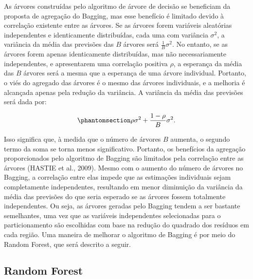 \documentclass[
  12pt,
  a4paper,
]{scrreprt}
\begin{document}
\vspace{12pt}

As árvores construídas pelo algoritmo de árvore de decisão se beneficiam
da proposta de agregação do Bagging, mas esse benefício é limitado
devido à correlação existente entre as árvores. Se as árvores forem
variáveis aleatórias independentes e identicamente distribuídas, cada
uma com variância \(\sigma^2\), a variância da média das previsões das
\(B\) árvores será \(\frac{1}{B} \sigma^2\). No entanto, se as árvores
forem apenas identicamente distribuídas, mas não necessariamente
independentes, e apresentarem uma correlação positiva \(\rho\), a
esperança da média das \(B\) árvores será a mesma que a esperança de uma
árvore individual. Portanto, o viés do agregado das árvores é o mesmo
das árvores individuais, e a melhoria é alcançada apenas pela redução da
variância. A variância da média das previsões será dada por:

\begin{equation}\phantomsection\label{eq-cor}{
\rho \sigma^2 + \frac{1 - \rho}{B}\sigma^2\text{.}
}\end{equation}

Isso significa que, à medida que o número de árvores \(B\) aumenta, o
segundo termo da soma se torna menos significativo. Portanto, os
benefícios da agregação proporcionados pelo algoritmo de Bagging são
limitados pela correlação entre as árvores (HASTIE et al., 2009). Mesmo
com o aumento do número de árvores no Bagging, a correlação entre elas
impede que as estimações individuais sejam completamente independentes,
resultando em menor diminuição da variância da média das previsões do
que seria esperado se as árvores fossem totalmente independentes. Ou
seja, as árvores geradas pelo Bagging tendem a ser bastante semelhantes,
uma vez que as variáveis independentes selecionadas para o
particionamento são escolhidas com base na redução do quadrado dos
resíduos em cada região. Uma maneira de melhorar o algoritmo de Bagging
é por meio do Random Forest, que será descrito a seguir.

\subsection{Random Forest}\label{random-forest}
\end{document}
